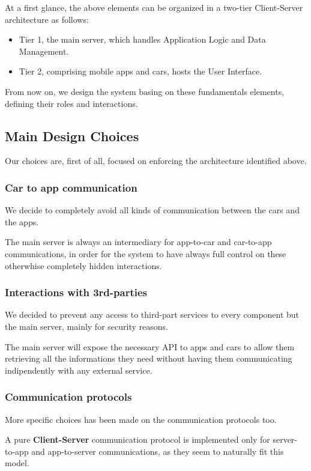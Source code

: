\documentclass[11pt]{article} %
\begin{document}
At a first glance, the above elements can be organized in a two-tier Client-Server architecture as follows:
\begin{itemize}[noitemsep]
	\item Tier 1, the main server, which handles Application Logic and Data Management.
	\item Tier 2, comprising mobile apps and cars, hosts the User Interface.
\end{itemize}
From now on, we design the system basing on these fundamentals elements, defining their roles and interactions.




\subsection{Main Design Choices}

Our choices are, first of all, focused on enforcing the architecture identified above. 

\subsubsection{Car to app communication}
We decide to completely avoid all kinds of communication between the cars and the apps. 

 The main server is always an intermediary for app-to-car and car-to-app communications, in order for the system to have always full control on these otherwhise completely hidden interactions.

\subsubsection{Interactions with 3rd-parties}
We decided to prevent any access to third-part services to every component but the main server, mainly for security reasons.

The main server will expose the necessary API to apps and cars to allow them retrieving all the informations they need without having them communicating indipendently with any external service.

\subsubsection{Communication protocols}
More specific choices has been made on the communication protocols too.

A pure \textbf{Client-Server} communication protocol is implemented only for server-to-app and app-to-server communications, as they seem to naturally fit this model.
\end{document}
